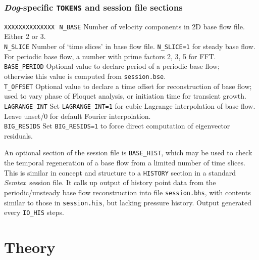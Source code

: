 \documentclass[11pt,a4paper]{report}
\newcommand{\Semtex}{\emph{Semtex}}
\newcommand{\Dog}{\emph{Dog}}
\begin{document}
\subsection{\Dog-specific \texttt{TOKENS} and session file sections}

\begin{tabbing}
\texttt{XXXXXXXXXXXXXX} \= \kill 
%
\texttt{N\_BASE}  \>
  Number of velocity components in 2D base flow file.  Either 2 or 3.\\
\texttt{N\_SLICE}  \>
  Number of `time slices' in base flow file. \verb+N_SLICE=1+ for 
  steady base flow.\\
  \> For periodic base flow, a number with prime factors 2, 3, 5 for FFT.\\
\texttt{BASE\_PERIOD}  \>
  Optional value to declare period of a periodic base flow;\\
  \>  otherwise this value is computed from \verb+session.bse+.\\
\texttt{T\_OFFSET}  \>
  Optional value to declare a time offset for reconstruction of base flow;\\
  \>  used to vary phase of Floquet analysis, or initiation time for
      transient growth.\\
\texttt{LAGRANGE\_INT} \>
  Set \verb+LAGRANGE_INT=1+ for cubic Lagrange interpolation of base flow.\\
  \> Leave unset/0 for default Fourier interpolation.\\
\texttt{BIG\_RESIDS} \>
  Set \verb+BIG_RESIDS=1+ to force direct computation of 
  eigenvector residuals.
\end{tabbing}

An optional section of the session file is \verb+BASE_HIST+, which may
be used to check the temporal regeneration of a base flow from a
limited number of time slices.  This is similar in concept and
structure to a \verb+HISTORY+ section in a standard \Semtex\ session
file. It calls up output of history point data from the
periodic/unsteady base flow reconstruction into file
\verb+session.bhs+, with contents similar to those in
\verb+session.his+, but lacking pressure history.  Output generated
every \verb+IO_HIS+ steps.


\chapter{Theory}
\label{ch.theory}
\end{document}
